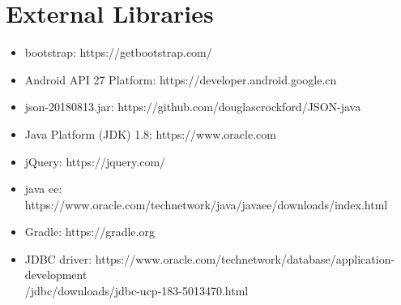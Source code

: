 \documentclass[a4paper,11pt]{article}
\begin{document}
\section{External Libraries}
\begin{itemize}
    \item bootstrap: https://getbootstrap.com/
    \item Android API 27 Platform: https://developer.android.google.cn
    \item json-20180813.jar: https://github.com/douglascrockford/JSON-java
    \item Java Platform (JDK) 1.8: https://www.oracle.com
    \item jQuery: https://jquery.com/
    \item java ee: https://www.oracle.com/technetwork/java/javaee/downloads/index.html
    \item Gradle: https://gradle.org
    \item JDBC driver: https://www.oracle.com/technetwork/database/application-development\\
    /jdbc/downloads/jdbc-ucp-183-5013470.html
\end{itemize}
\end{document}
